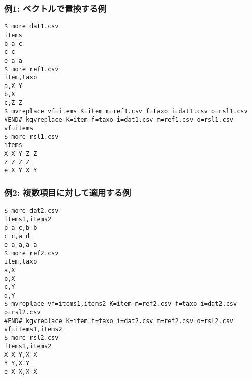 \subsubsection*{例1: ベクトルで置換する例}



\begin{Verbatim}[baselinestretch=0.7,frame=single]
$ more dat1.csv
items
b a c
c c
e a a
$ more ref1.csv
item,taxo
a,X Y
b,X
c,Z Z
$ mvreplace vf=items K=item m=ref1.csv f=taxo i=dat1.csv o=rsl1.csv
#END# kgvreplace K=item f=taxo i=dat1.csv m=ref1.csv o=rsl1.csv vf=items
$ more rsl1.csv
items
X X Y Z Z
Z Z Z Z
e X Y X Y
\end{Verbatim}
\subsubsection*{例2: 複数項目に対して適用する例}



\begin{Verbatim}[baselinestretch=0.7,frame=single]
$ more dat2.csv
items1,items2
b a c,b b
c c,a d
e a a,a a
$ more ref2.csv
item,taxo
a,X
b,X
c,Y
d,Y
$ mvreplace vf=items1,items2 K=item m=ref2.csv f=taxo i=dat2.csv o=rsl2.csv
#END# kgvreplace K=item f=taxo i=dat2.csv m=ref2.csv o=rsl2.csv vf=items1,items2
$ more rsl2.csv
items1,items2
X X Y,X X
Y Y,X Y
e X X,X X
\end{Verbatim}
